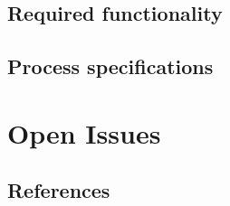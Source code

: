 \documentclass[a4paper,12pt]{article}
\begin{document}
\subsection{Required functionality}

\subsection{Process specifications}

\newpage
\section{Open Issues}

\subsection{References}
\end{document}
